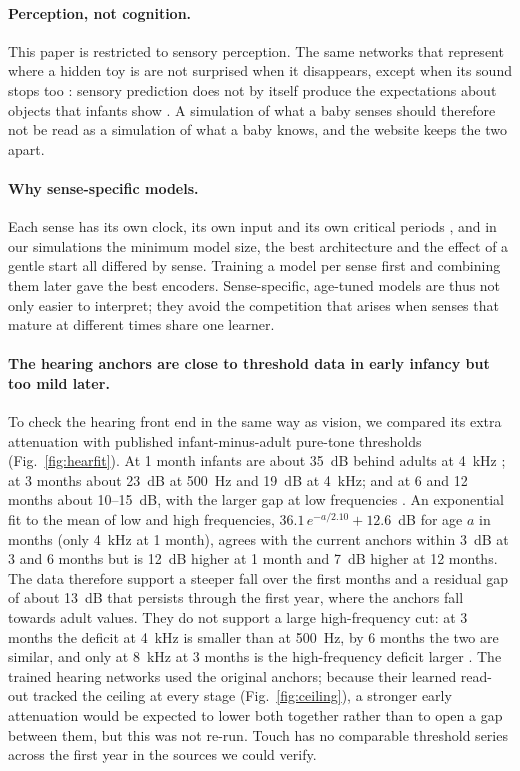 \documentclass{article}
\begin{document}
\paragraph{Perception, not cognition.} This paper is restricted to sensory perception. The same networks that represent where a hidden toy is are not surprised when it disappears, except when its sound stops too \autocite{mohapatra2026learn}: sensory prediction does not by itself produce the expectations about objects that infants show \autocite{baillargeon1987object}. A simulation of what a baby senses should therefore not be read as a simulation of what a baby knows, and the website keeps the two apart.

\paragraph{Why sense-specific models.} Each sense has its own clock, its own input and its own critical periods \autocite{hensch2005critical,werker2015critical}, and in our simulations the minimum model size, the best architecture and the effect of a gentle start all differed by sense. Training a model per sense first and combining them later gave the best encoders. Sense-specific, age-tuned models are thus not only easier to interpret; they avoid the competition that arises when senses that mature at different times share one learner.

\paragraph{The hearing anchors are close to threshold data in early infancy but too mild later.} To check the hearing front end in the same way as vision, we compared its extra attenuation with published infant-minus-adult pure-tone thresholds (Fig.~\ref{fig:hearfit}). At 1 month infants are about 35~dB behind adults at 4~kHz \autocite{werner1990puretone,werner2007issues}; at 3 months about 23~dB at 500~Hz and 19~dB at 4~kHz; and at 6 and 12 months about 10--15~dB, with the larger gap at low frequencies \autocite{olsho1988pure}. An exponential fit to the mean of low and high frequencies, $36.1\,e^{-a/2.10} + 12.6$~dB for age $a$ in months (only 4~kHz at 1 month), agrees with the current anchors within 3~dB at 3 and 6 months but is 12~dB higher at 1 month and 7~dB higher at 12 months. The data therefore support a steeper fall over the first months and a residual gap of about 13~dB that persists through the first year, where the anchors fall towards adult values. They do not support a large high-frequency cut: at 3 months the deficit at 4~kHz is smaller than at 500~Hz, by 6 months the two are similar, and only at 8~kHz at 3 months is the high-frequency deficit larger \autocite{olsho1988pure}. The trained hearing networks used the original anchors; because their learned read-out tracked the ceiling at every stage (Fig.~\ref{fig:ceiling}), a stronger early attenuation would be expected to lower both together rather than to open a gap between them, but this was not re-run. Touch has no comparable threshold series across the first year in the sources we could verify.
\end{document}
